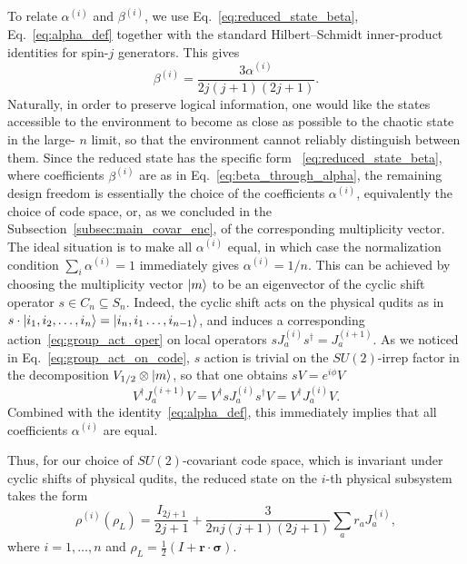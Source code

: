 \documentclass[10pt,twocolumn,superscriptaddress,aps,amsmath,amssymb,citeautoscript,floatfix,prx,longbibliography]{revtex4-2}
\theoremstyle{plain}
\theoremstyle{plain}
\theoremstyle{plain}
\theoremstyle{plain}
\theoremstyle{plain}
\theoremstyle{plain}
\begin{document}
To relate \(\alpha^{(i)}\) and \(\beta^{(i)}\), we use Eq.~\eqref{eq:reduced_state_beta}, Eq.~\eqref{eq:alpha_def} together with the standard Hilbert--Schmidt inner-product identities for spin-\(j\) generators. This gives
\begin{equation}\label{eq:beta_through_alpha}
    \beta^{(i)}
    =
    \frac{3\alpha^{(i)}}{2j(j+1)(2j+1)}.
\end{equation}
Naturally, in order to preserve logical information, one would like the states accessible to the environment to become as close as possible to the chaotic state in the large- $n$ limit, so that the environment cannot reliably distinguish between them. Since the reduced state has the specific form ~\eqref{eq:reduced_state_beta}, where coefficients $\beta^{(i)}$ are as in Eq.~\eqref{eq:beta_through_alpha}, the remaining design freedom is essentially the choice of the coefficients $\alpha^{(i)}$, equivalently the choice of code space, or, as we concluded in the Subsection~\ref{subsec:main_covar_enc}, of the corresponding multiplicity vector. The ideal situation is to make all $\alpha^{(i)}$ equal, in which case the normalization condition $\sum_i \alpha^{(i)}=1$ immediately gives $\alpha^{(i)}=1 / n$. This can be achieved by choosing the multiplicity vector $\ket{m}$ to be an eigenvector of the cyclic shift operator $s\in C_n\subseteq S_n$. Indeed, the cyclic shift acts on the physical qudits as in $s\cdot \ket{i_1, i_2, \dots, i_n}=\ket{i_{n}, i_1 \dots, i_{n-1}}$, and induces a corresponding action~\eqref{eq:group_act_oper} on local operators $s J_a^{(i)} s^{\dagger}=J_a^{(i+1)}$. As we noticed in  Eq.~\eqref{eq:group_act_on_code}, $s$ action is trivial on the $SU(2)$-irrep factor in the decomposition $V_{1/2}\otimes \ket{m}$, so that one obtains $sV=e^{i\phi} V$
\[
    V^{\dagger} J_a^{(i+1)} V=V^{\dagger} s J_a^{(i)} s^{\dagger} V=V^{\dagger} J_a^{(i)} V.
\]
Combined with the identity~\eqref{eq:alpha_def}, this immediately implies that all coefficients $\alpha^{(i)}$ are equal.

Thus, for our choice of $SU(2)$-covariant code space, which is invariant under cyclic shifts of physical qudits, the reduced state on the $i$-th physical subsystem takes the form
\begin{equation}\label{eq:reduced_state_su2}
    \rho^{(i)}\left(\rho_L\right)=\frac{I_{2 j+1}}{2 j+1}+\frac{3}{2 n j(j+1)(2 j+1)} \sum_a r_a J_a^{(i)},
\end{equation}
where $i=1, \ldots, n$ and $
    \rho_L
    =
    \frac12(I+\mathbf r\cdot \boldsymbol\sigma).
$
\end{document}
